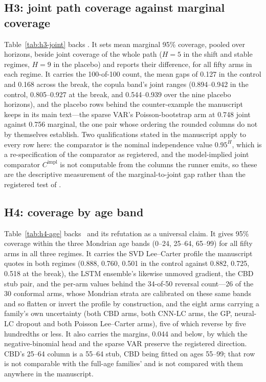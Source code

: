 \subsection{H3: joint path coverage against marginal coverage}

Table~\ref{tab:h3-joint} backs \Hthree. It sets mean marginal 95\% coverage,
pooled over horizons, beside joint coverage of the whole path ($H=5$ in the
shift and stable regimes, $H=9$ in the placebo) and reports their difference,
for all fifty arms in each regime. It carries the 100-of-100 count, the mean
gaps of 0.127 in the control and 0.168 across the break, the copula band's
joint ranges (0.894--0.942 in the control, 0.805--0.927 at the break, and
0.544--0.939 over the nine placebo horizons), and the placebo rows behind the
counter-example the manuscript keeps in its main text---the sparse VAR's
Poisson-bootstrap arm at 0.748 joint against 0.756 marginal, the one pair whose
ordering the rounded columns do not by themselves establish. Two
qualifications stated in the manuscript apply to every row here: the comparator
is the nominal independence value $0.95^{H}$, which is a re-specification of
the comparator as registered, and the model-implied joint comparator
$C^{\mathrm{impl}}$ is not computable from the columns the runner emits, so
these are the descriptive measurement of the marginal-to-joint gap rather than
the registered test of \Hthree.


\subsection{H4: coverage by age band}

Table~\ref{tab:h4-age} backs \Hfour\ and its refutation as a universal claim.
It gives 95\% coverage within the three Mondrian age bands (0--24, 25--64,
65--99) for all fifty arms in all three regimes. It carries the SVD
Lee--Carter profile the manuscript quotes in both regimes (0.888, 0.760, 0.501
in the control against 0.882, 0.725, 0.518 at the break), the LSTM ensemble's
likewise unmoved gradient, the CBD stub pair, and the per-arm values behind the
34-of-50 reversal count---26 of the 30 conformal arms, whose Mondrian strata
are calibrated on these same bands and so flatten or invert the profile by
construction, and the eight arms carrying a family's own uncertainty (both CBD
arms, both CNN-LC arms, the GP, neural-LC dropout and both Poisson Lee--Carter
arms), five of which reverse by five hundredths or less. It also carries the
margins, 0.044 and below, by which the negative-binomial head and the sparse
VAR preserve the registered direction. CBD's 25--64 column is a 55--64 stub,
CBD being fitted on ages 55--99; that row is not comparable with the full-age
families' and is not compared with them anywhere in the manuscript.

